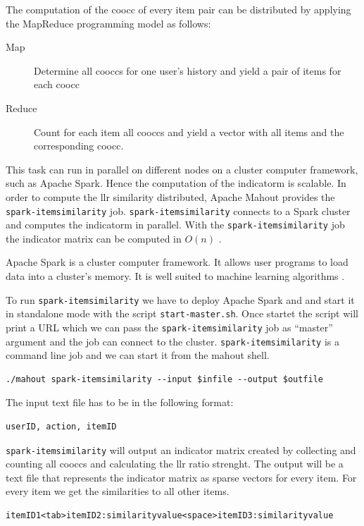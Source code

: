 The computation of the \gls{coocc} of every item pair can be distributed by applying the MapReduce programming model as follows:
\begin{description}
\item[Map] Determine all \glspl{coocc} for one user's history and yield a pair of items for each \gls{coocc}
\item[Reduce] Count for each item all \glspl{coocc} and yield a vector with all items and the corresponding \gls{coocc}.
\end{description}

This task can run in parallel on different nodes on a cluster computer framework, such as Apache Spark. Hence the computation of the \gls{indicatorm} is \gls{scalable}.
In order to compute the \gls{llr} similarity distributed, Apache Mahout provides the \verb|spark-itemsimilarity| job. \verb|spark-itemsimilarity| connects to a Spark cluster and computes the \gls{indicatorm} in parallel.  With the \verb|spark-itemsimilarity| job the indicator matrix can be computed in $O(n)$ \cite{Schelter}. 

Apache Spark is a cluster computer framework. It allows user programs to load data into a cluster's memory. It is well suited to machine learning algorithms \cite{Karau}.

To run \verb|spark-itemsimilarity| we have to deploy Apache Spark and and start it in standalone mode with the script \verb|start-master.sh|. Once startet the script will print a URL which we can pass the \verb|spark-itemsimilarity| job as ``master'' argument and the job can connect to the cluster. \verb|spark-itemsimilarity| is a command line job and we can start it from the mahout shell.

\begin{verbatim}
./mahout spark-itemsimilarity --input $infile --output $outfile
\end{verbatim}

The input text file has to be in the following format:
\begin{verbatim}
userID, action, itemID
\end{verbatim}
\verb|spark-itemsimilarity| will output an indicator matrix created by collecting and counting all \glspl{coocc} and calculating the \gls{llr} ratio strenght. The output will be a text file that represents the indicator matrix as sparse vectors for every item. For every item we get the similarities to all other items.
\begin{verbatim}
itemID1<tab>itemID2:similarityvalue<space>itemID3:similarityvalue
\end{verbatim}


